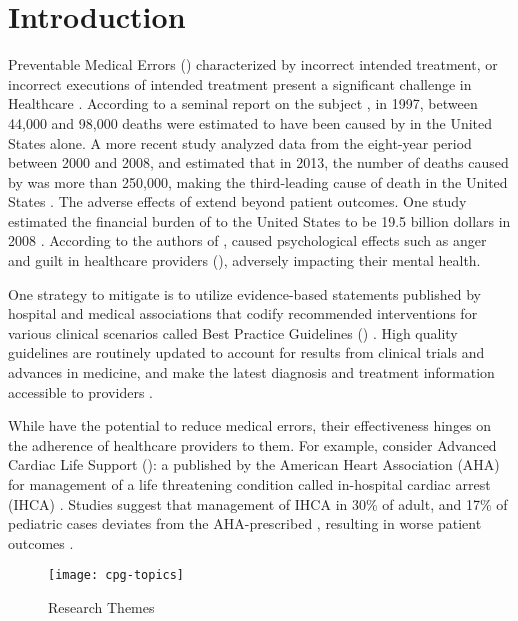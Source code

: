 \section{Introduction}

Preventable Medical Errors (\PMEs{}) characterized by
incorrect intended treatment, or incorrect executions of intended
treatment present a significant challenge in Healthcare
\cite{RodziewiczStatsPearls18}. According to a seminal report on the subject
\cite{DonaldsonBook00}, in 1997,
between 44,000 and 98,000 deaths were estimated to have been caused by \PMEs{} in
the United States alone. A more recent study analyzed data from the eight-year
period between 2000 and 2008, and estimated that in 2013, the number of deaths
caused by \PMEs{} was more than 250,000, making \PMEs{} the third-leading
cause of death in the United States \cite{MakaryBMJ16}.
The adverse effects of \PMEs{} extend beyond patient outcomes.
One study estimated the financial burden of \PMEs{} to the United States to be
19.5 billion dollars in 2008 \cite{AndelJHCF12}. According to the authors of
\cite{RodziewiczStatsPearls18}, \PMEs{} caused psychological effects such
as anger and guilt in healthcare providers (\HCPs{}), adversely impacting their mental
health.

One strategy to mitigate \PMEs{} is to utilize evidence-based statements
published by hospital and medical associations that codify recommended
interventions for various clinical scenarios called Best Practice Guidelines (\BPGs{})
\cite{field1990clinical}. High quality guidelines are routinely updated to account for
 results from clinical trials and advances in medicine, and make the latest
 diagnosis and treatment information accessible to providers \cite{SteinbergNAP11}.

While \BPGs{} have the potential to reduce medical errors, their effectiveness hinges
on the adherence of healthcare providers to them.
For example, consider Advanced Cardiac Life Support (\ACLS{}): a \BPG{} published
by the American Heart Association (AHA) for management
of a life threatening condition called in-hospital cardiac arrest (IHCA) \cite{AHAGuidelineAdult, AHAGuidelinePed}. Studies suggest that management
of IHCA in 30\% of adult, and 17\% of pediatric cases deviates from the
AHA-prescribed \BPG, resulting in worse patient outcomes \cite{Ornato2012DeviationAdult,Wolfe2020DeviationPediatric,
Crowley2020DeviationAdult,Honarmand2018Adherence,Mcevoy2014Adherence}.

\begin{wrapfigure}{l}{0.5\textwidth}
  \texttt{[image: cpg-topics]}
  \caption{\CDSSs{} Research Themes}\label{fig:cpg-research-topics}
\end{wrapfigure}

